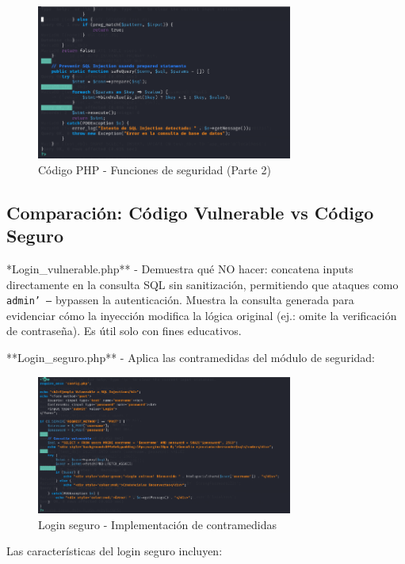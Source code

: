 \documentclass[12pt,a4paper]{article}
\begin{document}
\begin{figure}[H]
	\centering
	\includegraphics[width=0.75\textwidth]{./assets/img6.png}
	\caption{Código PHP - Funciones de seguridad (Parte 2)}
	\label{fig:php-seguridad-2}
\end{figure}

\subsection{Comparación: Código Vulnerable vs Código Seguro}

\**Login\_vulnerable.php** - Demuestra qué NO hacer: concatena inputs directamente en la consulta SQL sin sanitización, permitiendo que ataques como \texttt{admin' --} bypassen la autenticación. Muestra la consulta generada para evidenciar cómo la inyección modifica la lógica original (ej.: omite la verificación de contraseña). Es útil solo con fines educativos.

**Login\_seguro.php** - Aplica las contramedidas del módulo de seguridad:

\begin{figure}[H]
	\centering
	\includegraphics[width=0.75\textwidth]{./assets/img7.png}
	\caption{Login seguro - Implementación de contramedidas}
	\label{fig:login-seguro}
\end{figure}

Las características del login seguro incluyen:
\end{document}
